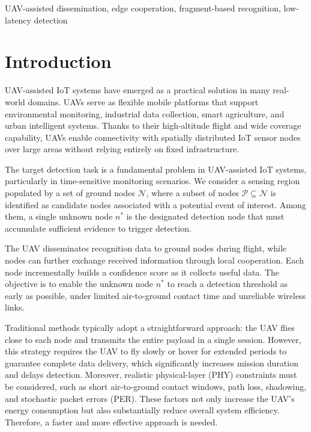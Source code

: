 \documentclass[conference]{IEEEtran}
\begin{document}
\begin{abstract}


\end{abstract}

\begin{IEEEkeywords}
UAV-assisted dissemination, edge cooperation, fragment-based recognition, low-latency detection
\end{IEEEkeywords}
\section{Introduction}

UAV-assisted IoT systems have emerged as a practical solution in many real-world domains. UAVs serve as flexible mobile platforms that support environmental monitoring, industrial data collection, smart agriculture, and urban intelligent systems. Thanks to their high-altitude flight and wide coverage capability, UAVs enable connectivity with spatially distributed IoT sensor nodes over large areas without relying entirely on fixed infrastructure.

The target detection task is a fundamental problem in UAV-assisted IoT systems, particularly in time-sensitive monitoring scenarios. We consider a sensing region populated by a set of ground nodes $\mathcal{N}$, where a subset of nodes $\mathcal{P} \subseteq \mathcal{N}$ is identified as candidate nodes associated with a potential event of interest. Among them, a single unknown node $n^*$ is the designated detection node that must accumulate sufficient evidence to trigger detection.

The UAV disseminates recognition data to ground nodes during flight, while nodes can further exchange received information through local cooperation. Each node incrementally builds a confidence score as it collects useful data. The objective is to enable the unknown node $n^*$ to reach a detection threshold as early as possible, under limited air-to-ground contact time and unreliable wireless links.

Traditional methods typically adopt a straightforward approach: the UAV flies close to each node and transmits the entire payload in a single session. However, this strategy requires the UAV to fly slowly or hover for extended periods to guarantee complete data delivery, which significantly increases mission duration and delays detection. Moreover, realistic physical-layer (PHY) constraints must be considered, such as short air-to-ground contact windows, path loss, shadowing, and stochastic packet errors (PER). These factors not only increase the UAV’s energy consumption but also substantially reduce overall system efficiency. Therefore, a faster and more effective approach is needed.
\end{document}
